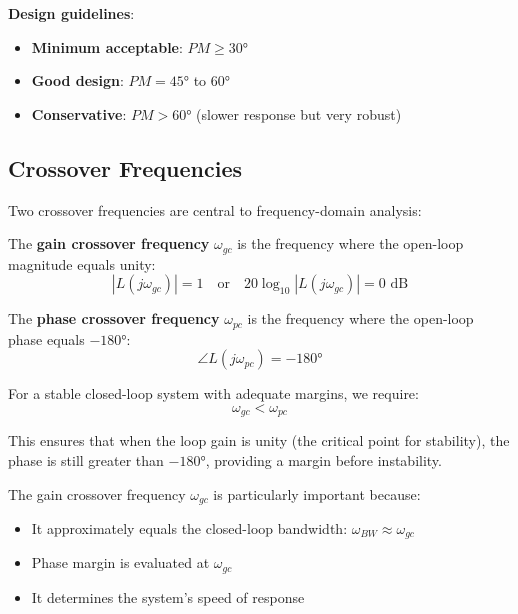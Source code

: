 \textbf{Design guidelines}:
\begin{itemize}
    \item \textbf{Minimum acceptable}: $PM \geq 30°$
    \item \textbf{Good design}: $PM = 45°$ to $60°$
    \item \textbf{Conservative}: $PM > 60°$ (slower response but very robust)
\end{itemize}


\subsection{Crossover Frequencies}
\label{subsec:crossover_freqs}

Two crossover frequencies are central to frequency-domain analysis:

\begin{definition}
The \textbf{gain crossover frequency} $\omega_{gc}$ is the frequency where the open-loop magnitude equals unity:
\begin{equation}
    |L(j\omega_{gc})| = 1 \quad \text{or} \quad 20\log_{10}|L(j\omega_{gc})| = 0 \text{ dB}
\end{equation}
\end{definition}

\begin{definition}
The \textbf{phase crossover frequency} $\omega_{pc}$ is the frequency where the open-loop phase equals $-180°$:
\begin{equation}
    \angle L(j\omega_{pc}) = -180°
\end{equation}
\end{definition}

For a stable closed-loop system with adequate margins, we require:
\begin{equation}
    \omega_{gc} < \omega_{pc}
\end{equation}

This ensures that when the loop gain is unity (the critical point for stability), the phase is still greater than $-180°$, providing a margin before instability.

The gain crossover frequency $\omega_{gc}$ is particularly important because:
\begin{itemize}
    \item It approximately equals the closed-loop bandwidth: $\omega_{BW} \approx \omega_{gc}$
    \item Phase margin is evaluated at $\omega_{gc}$
    \item It determines the system's speed of response
\end{itemize}

